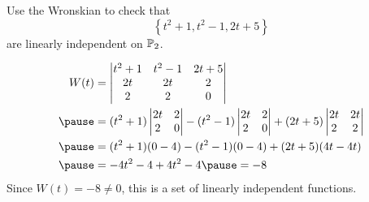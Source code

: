 \documentclass{beamer}
\begin{document}
\begin{frame}
\begin{example}
Use the Wronskian to check that
\begin{equation*}
\left\{t^2+1, t^2-1, 2t+5\right\}
\end{equation*}
are linearly independent on $\mathbb{P}_2$.\pause

\begin{equation*}
\begin{aligned}
W(t)&=
\begin{vmatrix}
t^2+1 & t^2-1 & 2t+5 \\
2t    & 2t    & 2    \\
2     & 2     & 0    \\
\end{vmatrix}\\\pause
&=(t^2+1)
\begin{vmatrix}
2t & 2 \\
2  & 0 \\
\end{vmatrix}
-(t^2-1)
\begin{vmatrix}
2t & 2 \\
2  & 0 \\
\end{vmatrix}
+(2t+5)
\begin{vmatrix}
2t & 2t \\
2  & 2  \\
\end{vmatrix}\\\pause
&=(t^2+1)(0-4)-(t^2-1)(0-4)+(2t+5)(4t-4t)\\\pause
&=-4t^2-4+4t^2-4\pause = -8
\end{aligned}
\end{equation*}
Since $W(t)=-8\neq 0$, this is a set of linearly independent functions.
\end{example}
\end{frame}
\end{document}
